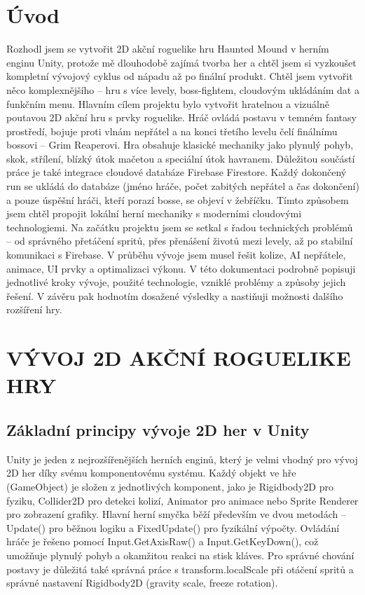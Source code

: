\documentclass[12pt,a4paper]{article}
\begin{document}
	\section*{Úvod}
	
	Rozhodl jsem se vytvořit 2D akční roguelike hru Haunted Mound v herním enginu Unity, protože mě dlouhodobě zajímá tvorba her a chtěl jsem si vyzkoušet kompletní vývojový cyklus od nápadu až po finální produkt. Chtěl jsem vytvořit něco komplexnějšího – hru s více levely, boss-fightem, cloudovým ukládáním dat a funkčním menu.
	Hlavním cílem projektu bylo vytvořit hratelnou a vizuálně poutavou 2D akční hru s prvky roguelike. Hráč ovládá postavu v temném fantasy prostředí, bojuje proti vlnám nepřátel a na konci třetího levelu čelí finálnímu bossovi – Grim Reaperovi. Hra obsahuje klasické mechaniky jako plynulý pohyb, skok, střílení, blízký útok mačetou a speciální útok havranem.
	Důležitou součástí práce je také integrace cloudové databáze Firebase Firestore. Každý dokončený run se ukládá do databáze (jméno hráče, počet zabitých nepřátel a čas dokončení) a pouze úspěšní hráči, kteří porazí bosse, se objeví v žebříčku. Tímto způsobem jsem chtěl propojit lokální herní mechaniky s moderními cloudovými technologiemi.
	Na začátku projektu jsem se setkal s řadou technických problémů – od správného přetáčení spritů, přes přenášení životů mezi levely, až po stabilní komunikaci s Firebase. V průběhu vývoje jsem musel řešit kolize, AI nepřátele, animace, UI prvky a optimalizaci výkonu. V této dokumentaci podrobně popisuji jednotlivé kroky vývoje, použité technologie, vzniklé problémy a způsoby jejich řešení. V závěru pak hodnotím dosažené výsledky a nastiňuji možnosti dalšího rozšíření hry.
	
	\newpage
	
	\section{VÝVOJ 2D AKČNÍ ROGUELIKE HRY}
	
	\subsection{Základní principy vývoje 2D her v Unity}
	
    Unity je jeden z nejrozšířenějších herních enginů, který je velmi vhodný pro vývoj 2D her díky svému komponentovému systému. Každý objekt ve hře (GameObject) je složen z jednotlivých komponent, jako je Rigidbody2D pro fyziku, Collider2D pro detekci kolizí, Animator pro animace nebo Sprite Renderer pro zobrazení grafiky.
    Hlavní herní smyčka běží především ve dvou metodách – Update() pro běžnou logiku a FixedUpdate() pro fyzikální výpočty. Ovládání hráče je řešeno pomocí Input.GetAxisRaw() a Input.GetKeyDown(), což umožňuje plynulý pohyb a okamžitou reakci na stisk kláves. Pro správné chování postavy je důležitá také správná práce s transform.localScale při otáčení spritů a správné nastavení Rigidbody2D (gravity scale, freeze rotation).
	
\end{document}
